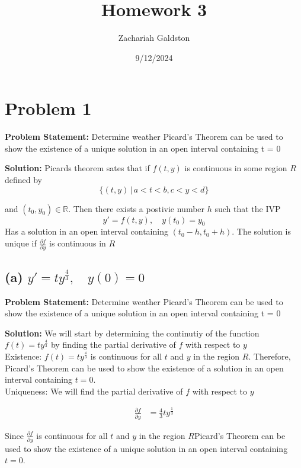 \documentclass[12pt, letterpaper]{article}
\title{Homework 3}
\author{Zachariah Galdston}
\date{9/12/2024}
\begin{document}
\maketitle

\section*{Problem 1}

\textbf{Problem Statement:} Determine weather Picard's Theorem can be used to show the existence of a unique solution in an open interval containing t = 0

\textbf{Solution:} Picards theorem sates that if $f(t,y)$ is continuous in some region $R$ defined by 
\[ \{(t,y) \,|\, a < t < b, c < y < d\} \] 

and $(t_0, y_0) \in \mathbb{R}$. Then there exists a postivie number $h$ such that the IVP
\[ y' = f(t,y), \quad y(t_0) = y_0\]
Has a solution in an open interval containing $(t_0 - h, t_0 + h)$. The solution is unique if $\frac{\partial f}{\partial y}$ is continuous in $R$

\subsection*{(a) $y' = ty^{\frac{4}{3}}, \quad y(0) = 0$}
\textbf{Problem Statement:} Determine weather Picard's Theorem can be used to show the existence of a unique solution in an open interval containing t = 0

\textbf{Solution:} We will start by determining the continutiy of the function $f(t) = ty^{\frac{4}{3}}$ by finding the partial derivative of $f$ with respect to $y$ \\

Existence: $f(t) = ty^{\frac{4}{3}}$ is continuous for all $t$ and $y$ in the region $R$. Therefore, Picard's Theorem can be used to show the existence of a  solution in an open interval containing $t = 0$. \\

Uniqueness: We will find the partial derivative of $f$ with respect to $y$

\begin{align*}
\frac{\partial f}{\partial y} &= \frac{4}{3}ty^{\frac{1}{3}}
\end{align*}

Since $\frac{\partial f}{\partial y}$ is continuous for all $t$ and $y$ in the region $R$Picard's Theorem can be used to show the existence of a unique solution in an open interval containing $t = 0$.
\end{document}
